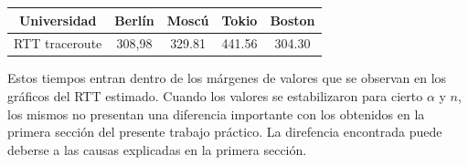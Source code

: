 \begin{center}
 \begin{tabular}{|c||c|c|c|c|}
    \hline
    Universidad & Berlín & Moscú & Tokio & Boston \\ \hline \hline
    RTT traceroute & 308,98 & 329.81 & 441.56 & 304.30 \\ \hline
 \end{tabular}
\end{center}

Estos tiempos entran dentro de los márgenes de valores que se observan en los gráficos del RTT estimado. Cuando los valores se estabilizaron para cierto $\alpha$ y $n$, los mismos no presentan una diferencia importante con los obtenidos en la primera sección del presente trabajo práctico. 
La direfencia encontrada puede deberse a las causas explicadas en la primera sección.
%
%
%
%
%
%

